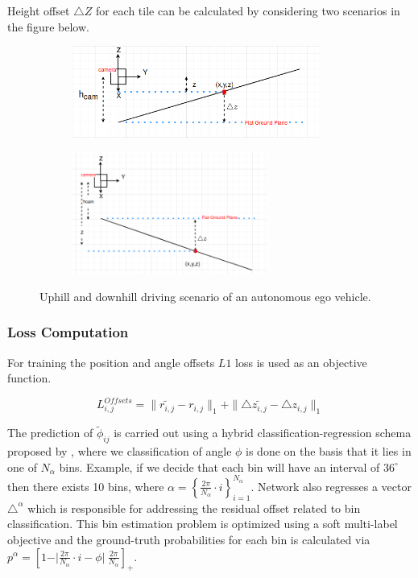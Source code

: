         
        Height offset $\triangle Z$ for each tile can be calculated by considering two scenarios in the figure below. 
        \begin{figure}[h]
        \centering
        \begin{subfigure}{0.4\textwidth}
        \includegraphics[width=1.2\linewidth, height=3cm]{images/delta_z_uphill.png} 
        \caption{}
        \label{fig:subim1}
        \end{subfigure}
        \begin{subfigure}{0.4\textwidth}
        \includegraphics[width=1\linewidth, height=4cm]{images/delat_z_downhill.png}
        \caption{}
        \label{fig:subim2}
        \end{subfigure}
        
        \caption{Uphill and downhill driving scenario of an autonomous ego vehicle.}
        \label{fig:image2}
        \end{figure}
        
        
        \subsubsection{Loss Computation}
            For training the position and angle offsets $L1$ loss is used as an objective function. 
            
            \begin{equation}
                L^{Offsets}_{i,j} = \parallel \widetilde{r_{i,j}} - r_{i,j} \parallel_{1} + \parallel \triangle{\widetilde{z_{i,j}}} - \triangle{z_{i,j}} \parallel_{1} 
             \end{equation}
             
             The prediction of $\widetilde{\phi}_{ij}$ is carried out using a hybrid classification-regression schema proposed by \cite{}, where we classification of angle $\phi$ is done on the basis that it lies in one of $N_{\alpha}$ bins. Example, if we decide that each bin will have an interval of $36^{\circ}$ then there exists 10 bins, where $\alpha = \left\{\frac{2\pi}{N_{\alpha} } \cdot i \right\}^{N_{\alpha}}_{i =1} $. Network also regresses a vector $\triangle^{\alpha}$ which is responsible for addressing the residual offset related to bin classification. This bin estimation problem is optimized using a soft multi-label objective and the ground-truth probabilities for each bin is calculated via $ p^{\alpha} = [1 - \vert \frac{2\pi}{N_{\alpha}} \cdot i  - \phi  \vert \ \frac{2\pi}{N_{\alpha}} ]_{+}$.
             
